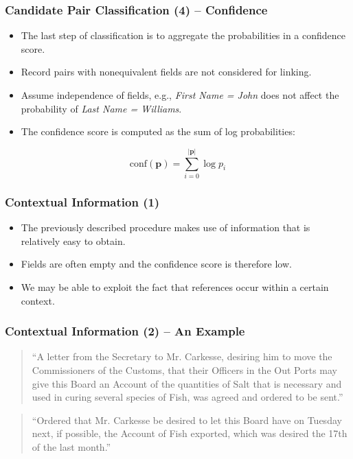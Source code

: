 \documentclass[12pt]{beamer}
\theoremstyle{break}
\begin{document}
\begin{frame}
	\frametitle{Candidate Pair Classification (4) -- Confidence}
	
	\begin{itemize}
		\item The last step of classification is to aggregate the probabilities in a confidence score.
		\item Record pairs with nonequivalent fields are not considered for linking.
		\item Assume independence of fields, e.g., \textit{First Name = John} does not affect the probability of \textit{Last Name = Williams}.
		\item The confidence score is computed as the sum of log probabilities:
	\end{itemize}
	
	\begin{equation*}
		\mathrm{conf}(\bm{p})=\sum_{i=0}^{\left\vert \bm{p} \right\vert}\log{p_i}
	\end{equation*}

\end{frame}




\begin{frame}
	\frametitle{Contextual Information (1)}
	
	\begin{itemize}
		\item The previously described procedure makes use of information that is relatively easy to obtain.
		\item Fields are often empty and the confidence score is therefore low.
		\item We may be able to exploit the fact that references occur within a certain \alert{context}.
	\end{itemize}

\end{frame}




\begin{frame}
	\frametitle{Contextual Information (2) -- An Example}

	\begin{quote}
	    ``A letter from the Secretary to Mr. Carkesse, desiring him to move the Commissioners of the Customs, that their Officers in the Out Ports may give this Board an Account of the quantities of Salt that is necessary and used in curing several species of Fish, was agreed and ordered to be sent.''
	\end{quote}
	
	\bigskip
	
	\begin{quote}
	    ``Ordered that Mr. Carkesse be desired to let this Board have on Tuesday next, if possible, the Account of Fish exported, which was desired the 17th of the last month.''
	\end{quote}
	
\end{frame}
\end{document}
